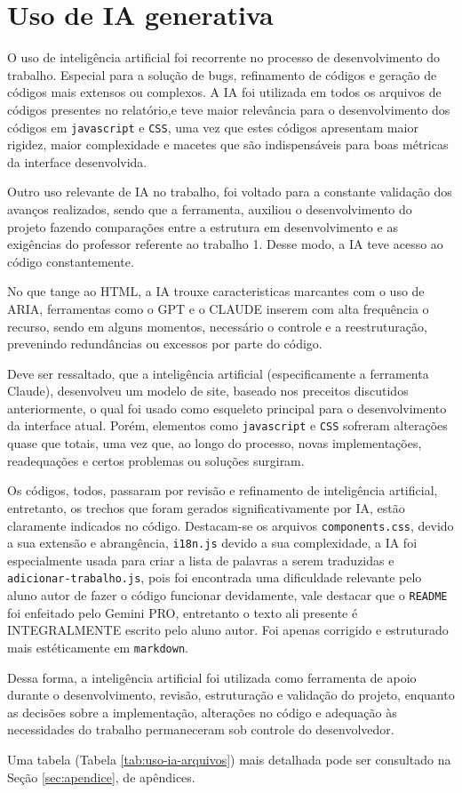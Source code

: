 \vspace{5mm}
\section{Uso de IA generativa}

O uso de inteligência artificial foi recorrente no processo de desenvolvimento do trabalho. Especial para a solução de bugs, refinamento de códigos e geração de códigos mais extensos ou complexos. A IA foi utilizada em todos os arquivos de códigos presentes no relatório,e teve maior relevância para o desenvolvimento dos códigos em \texttt{javascript} e \texttt{CSS}, uma vez que estes códigos apresentam maior rigidez, maior complexidade e macetes que são indispensáveis para boas métricas da interface desenvolvida. 

Outro uso relevante de IA no trabalho, foi voltado para a constante validação dos avanços realizados, sendo que a ferramenta, auxiliou o desenvolvimento do projeto fazendo comparações entre a estrutura em desenvolvimento e as exigências do professor referente ao trabalho 1. Desse modo, a IA teve acesso ao código constantemente. 

No que tange ao HTML, a IA trouxe caracteristicas marcantes com o uso de ARIA, ferramentas como o GPT e o CLAUDE inserem com alta frequência o recurso, sendo em alguns momentos, necessário o controle e a reestruturação, prevenindo redundâncias ou excessos por parte do código.

Deve ser ressaltado, que a inteligência artificial (especificamente a ferramenta Claude), desenvolveu um modelo de site, baseado nos preceitos discutidos anteriormente, o qual foi usado como esqueleto principal para o desenvolvimento da interface atual. Porém, elementos como \texttt{javascript} e \texttt{CSS} sofreram alterações quase que totais, uma vez que, ao longo do processo, novas implementações, readequações e certos problemas ou soluções surgiram.

Os códigos, todos, passaram por revisão e refinamento de inteligência artificial, entretanto, os trechos que foram gerados significativamente por IA, estão claramente indicados no código. Destacam-se os arquivos \texttt{components.css}, devido a sua extensão e abrangência, \texttt{i18n.js} devido a sua complexidade, a IA foi especialmente usada para criar a lista de palavras a serem traduzidas e \texttt{adicionar-trabalho.js}, pois foi encontrada uma dificuldade relevante pelo aluno autor de fazer o código funcionar devidamente, vale destacar que o \texttt{README} foi enfeitado pelo Gemini PRO, entretanto o texto ali presente é INTEGRALMENTE escrito pelo aluno autor. Foi apenas corrigido e estruturado mais estéticamente em \texttt{markdown}.

Dessa forma, a inteligência artificial foi utilizada como ferramenta de apoio durante o desenvolvimento, revisão, estruturação e validação do projeto, enquanto as decisões sobre a implementação, alterações no código e adequação às necessidades do trabalho permaneceram sob controle do desenvolvedor. 

Uma tabela (Tabela \ref{tab:uso-ia-arquivos}) mais detalhada pode ser consultado na Seção \ref{sec:apendice}, de apêndices.
